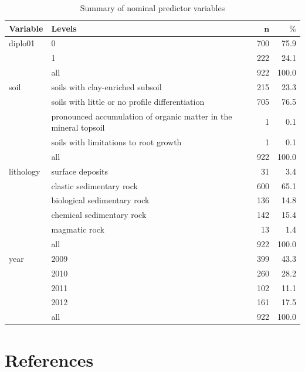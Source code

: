\documentclass[review]{elsarticle}
\begin{document}
\begin{table}[H]
	\centering
	\begingroup\footnotesize
	\begin{tabular}{ll|rr}
	 \textbf{Variable} & \textbf{Levels} & $\mathbf{n}$ & $\mathbf{\%}$ \\ 
		\hline
	diplo01 & 0 & 700 & 75.9 \\ 
		 & 1 & 222 & 24.1 \\ 
		 \hline
	 & all & 922 & 100.0 \\ 
		 \hline
	\hline
	soil & soils with clay-enriched subsoil & 215 & 23.3 \\ 
		 & soils with little or no profile differentiation & 705 & 76.5 \\ 
		 & pronounced accumulation of organic matter in the mineral topsoil & 1 & 0.1 \\ 
		 & soils with limitations to root growth & 1 & 0.1 \\ 
		 \hline
	 & all & 922 & 100.0 \\ 
		 \hline
	\hline
	lithology & surface deposits & 31 & 3.4 \\ 
		 & clastic sedimentary rock & 600 & 65.1 \\ 
		 & biological sedimentary rock & 136 & 14.8 \\ 
		 & chemical sedimentary rock & 142 & 15.4 \\ 
		 & magmatic rock & 13 & 1.4 \\ 
		 \hline
	 & all & 922 & 100.0 \\ 
		 \hline
	\hline
	year & 2009 & 399 & 43.3 \\ 
		 & 2010 & 260 & 28.2 \\ 
		 & 2011 & 102 & 11.1 \\ 
		 & 2012 & 161 & 17.5 \\ 
		 \hline
	 & all & 922 & 100.0 \\ 
		 \hline
	\hline
	\end{tabular}
	\endgroup
	\caption{Summary of nominal predictor variables} 
	\label{}
	\end{table}

\pagebreak

\section*{References}


\end{document}
